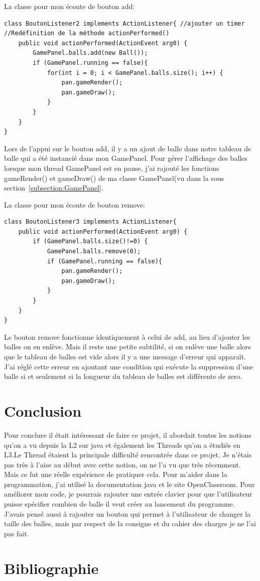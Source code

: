 \documentclass{article}
\begin{document}
La classe pour mon écoute de bouton add:
\begin{verbatim}
class BoutonListener2 implements ActionListener{ //ajouter un timer
//Redéfinition de la méthode actionPerformed()
    public void actionPerformed(ActionEvent arg0) {
        GamePanel.balls.add(new Ball());
        if (GamePanel.running == false){
            for(int i = 0; i < GamePanel.balls.size(); i++) {
                pan.gameRender();
                pan.gameDraw();
            }
        }
    }
}
\end{verbatim}

Lors de l'appui sur le bouton add, il y a un ajout de balle dans notre tableau de balle qui a été instancié dans mon GamePanel. Pour gérer l'affichage des balles lorsque mon thread GamePanel est en pause, j'ai rajouté les fonctions gameRender() et gameDraw() de ma classe GamePanel(vu dans la sous section~\ref{subsection:GamePanel}.\vspace{5mm}

La classe pour mon écoute de bouton remove:
\begin{verbatim}
class BoutonListener3 implements ActionListener{
    public void actionPerformed(ActionEvent arg0) {
        if (GamePanel.balls.size()!=0) {
            GamePanel.balls.remove(0);
            if (GamePanel.running == false){
                pan.gameRender();
                pan.gameDraw();
            }
        }
    }
}
\end{verbatim}

Le bouton remove fonctionne identiquement à celui de add, au lieu d'ajouter les balles on en enlève. Mais il reste une petite subtilité, si on enlève une balle alors que le tableau de balles est vide alors il y a une message d'erreur qui apparaît. J'ai réglé cette erreur en ajoutant une condition qui exécute la suppression d'une balle si et seulement si la longueur du tableau de balles est différente de zero. \newpage

\section{Conclusion}

Pour conclure il était intéressant de faire ce projet, il abordait toutes les notions qu'on a vu depuis la L2 sur java et également les Threads qu'on a étudiés en L3.\newline Le Thread étaient la principale difficulté rencontrée dans ce projet. Je n'étais pas très à l'aise au début avec cette notion, on ne l'a vu que très récemment. Mais ce fut une réelle expérience de pratiquer cela. Pour m'aider dans la programmation, j'ai utilisé la documentation java et le site OpenClassroom.\newline
Pour améliorer mon code, je pourrais rajouter une entrée clavier pour que l'utilisateur puisse spécifier combien de balle il veut créer au lancement du programme. J'avais pensé aussi à rajouter un bouton qui permet à l'utilisateur de changer la taille des balles, mais par respect de la consigne et du cahier des charges je ne l'ai pas fait.


\section{Bibliographie}
\nocite{*}


\end{document}
